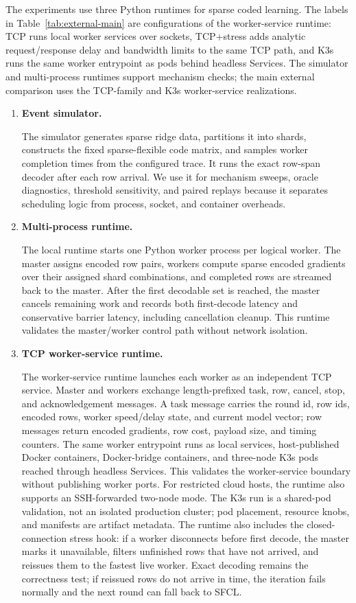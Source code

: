 The experiments use three Python runtimes for sparse coded learning.  The
labels in Table~\ref{tab:external-main} are configurations of the
worker-service runtime: TCP runs local worker services over sockets,
TCP+stress adds analytic request/response delay and bandwidth limits to the
same TCP path, and K3s runs the same worker entrypoint as pods behind headless
Services.  The simulator and multi-process runtimes support mechanism checks;
the main external comparison uses the TCP-family and K3s worker-service
realizations.
\begin{enumerate}
\setlength{\itemsep}{2pt}
\item \textbf{Event simulator.}\par
The simulator generates sparse ridge data,
partitions it into shards, constructs the fixed sparse-flexible code matrix, and
samples worker completion times from the configured trace.  It runs the exact
row-span decoder after each row arrival.  We use it for mechanism sweeps,
oracle diagnostics, threshold sensitivity, and paired replays because it
separates scheduling logic from process, socket, and container overheads.

\item \textbf{Multi-process runtime.}\par
The local runtime starts one Python
worker process per logical worker.  The master assigns encoded row pairs,
workers compute sparse encoded gradients over their assigned shard
combinations, and completed rows are streamed back to the master.  After the
first decodable set is reached, the master cancels remaining work and records
both first-decode latency and conservative barrier latency, including
cancellation cleanup.  This runtime validates the master/worker control path
without network isolation.

\item \textbf{TCP worker-service runtime.}\par
The worker-service runtime launches
each worker as an independent TCP service.  Master and workers exchange
length-prefixed task, row, cancel, stop, and acknowledgement messages.  A task
message carries the round id, row ids, encoded rows, worker speed/delay state,
and current model vector; row messages return encoded gradients, row cost,
payload size, and timing counters.  The same worker entrypoint runs as local
services, host-published Docker containers, Docker-bridge containers, and
three-node K3s pods reached through headless Services.  This validates the
worker-service boundary without publishing worker ports.  For restricted cloud
hosts, the runtime also supports an SSH-forwarded two-node mode.  The K3s run is
a shared-pod validation, not an isolated production cluster; pod placement,
resource knobs, and manifests are artifact metadata.  The runtime also includes
the closed-connection stress hook: if a worker disconnects before first decode,
the master marks it unavailable, filters unfinished rows that have not arrived,
and reissues them to the fastest live worker.  Exact decoding remains the
correctness test; if reissued rows do not arrive in time, the iteration fails
normally and the next round can fall back to SFCL.
\end{enumerate}


